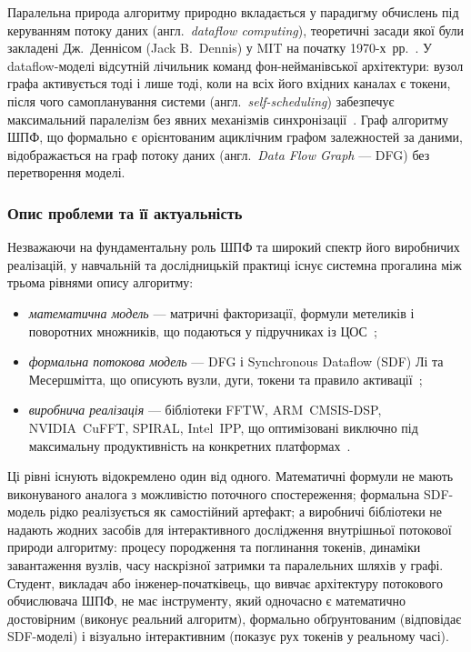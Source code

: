 Паралельна природа алгоритму природно вкладається у парадигму
обчислень під керуванням потоку даних (англ.\ \textit{dataflow
computing}), теоретичні засади якої були закладені Дж.~Деннісом
(Jack B.\ Dennis) у MIT на початку 1970-х~рр.~\cite{dennis1974,dennis1975}.
У dataflow-моделі відсутній лічильник команд фон-нейманівської
архітектури: вузол графа активується тоді і лише тоді, коли на
всіх його вхідних каналах є токени, після чого самопланування
системи (англ.\ \textit{self-scheduling}) забезпечує максимальний
паралелізм без явних механізмів синхронізації~\cite{veen1986}.
Граф алгоритму ШПФ, що формально є орієнтованим ациклічним графом
залежностей за даними, відображається на граф потоку даних
(англ.\ \textit{Data Flow Graph} --- DFG) без перетворення моделі.

\subsubsection*{Опис проблеми та її актуальність}

Незважаючи на фундаментальну роль ШПФ та широкий спектр його
виробничих реалізацій, у навчальній та дослідницькій практиці
існує системна прогалина між трьома рівнями опису алгоритму:

\begin{itemize}
  \item \textit{математична модель} --- матричні факторизації,
    формули метеликів і поворотних множників, що подаються у
    підручниках із ЦОС~\cite{nussbaumer1982,burrus1985dft};
  \item \textit{формальна потокова модель} --- DFG і Synchronous
    Dataflow (SDF) Лі та Месершмітта, що описують вузли, дуги,
    токени та правило активації~\cite{lee1994,veen1986};
  \item \textit{виробнича реалізація} --- бібліотеки FFTW,
    ARM~CMSIS-DSP, NVIDIA~CuFFT, SPIRAL, Intel~IPP, що оптимізовані
    виключно під максимальну продуктивність на конкретних
    платформах~\cite{frigo2005,cmsis_dsp,du2012,puschel2004,intel_ipp}.
\end{itemize}

Ці рівні існують відокремлено один від одного. Математичні формули
не мають виконуваного аналога з можливістю поточного спостереження;
формальна SDF-модель рідко реалізується як самостійний артефакт;
а виробничі бібліотеки не надають жодних засобів для інтерактивного
дослідження внутрішньої потокової природи алгоритму: процесу
породження та поглинання токенів, динаміки завантаження вузлів,
часу наскрізної затримки та паралельних шляхів у графі. Студент,
викладач або інженер-початківець, що вивчає архітектуру потокового
обчислювача ШПФ, не має інструменту, який одночасно є математично
достовірним (виконує реальний алгоритм), формально обґрунтованим
(відповідає SDF-моделі) і візуально інтерактивним (показує рух
токенів у реальному часі).

